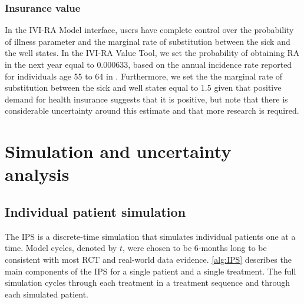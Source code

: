 \documentclass[11pt,final,fleqn]{article}\usepackage[]{graphicx}\usepackage[]{color}
\theoremstyle{plain}
\begin{document}
\subsubsection{Insurance value}
In the IVI-RA Model interface, users have complete control over the probability of illness parameter and the marginal rate of substitution between the sick and the well states. In the IVI-RA Value Tool, we set the probability of obtaining RA in the next year equal to $0.000633$, based on the annual incidence rate reported for individuals age 55 to 64 in \citet{myasoedova2010incidence}. Furthermore, we set the the marginal rate of substitution between the sick and well states equal to 1.5 given that positive demand for health insurance suggests that it is positive, but note that there is considerable uncertainty around this estimate and that more research is required.  

\section{Simulation and uncertainty analysis}\label{sec:sim-uncertainty}

\subsection{Individual patient simulation}\label{individual-patient-simulation}

The IPS is a discrete-time simulation that simulates individual patients one at a time. Model cycles, denoted by $t$, were chosen to be 6-months long to be consistent with most RCT and real-world data evidence. \autoref{alg:IPS} describes the main components of the IPS for a single patient and a single treatment. The full simulation cycles through each treatment in a treatment sequence and through each simulated patient.
\end{document}
